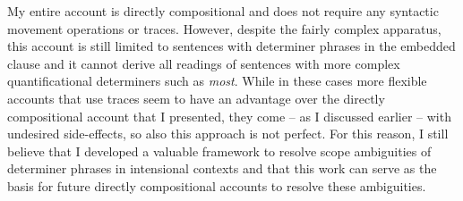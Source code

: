 \documentclass[parskip=half]{scrartcl}
\begin{document}
My entire account is directly compositional and does not require any syntactic movement operations or traces. However, despite the fairly complex apparatus, this account is still
limited to sentences with determiner phrases in the embedded clause and it cannot derive all readings of sentences with more complex 
quantificational determiners such as \textit{most}. While in these cases more flexible accounts that use traces seem to have an advantage over the directly compositional account that I presented, they come -- as I discussed earlier --
with undesired side-effects, so also this approach is not perfect. For this reason, I still believe that I developed a valuable framework to resolve scope ambiguities
of determiner phrases in intensional contexts and that this work can serve as the basis for future directly compositional accounts to resolve these ambiguities. 




\nocite{jacobson2014}
\nocite{fodor1970}
\nocite{heim1998}



\end{document}
